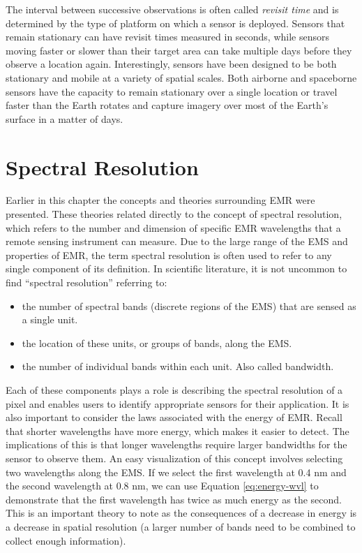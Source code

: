 \documentclass[
]{book}
\begin{document}
The interval between successive observations is often called \emph{revisit
time} and is determined by the type of platform on which a sensor is
deployed. Sensors that remain stationary can have revisit times measured
in seconds, while sensors moving faster or slower than their target area
can take multiple days before they observe a location again.
Interestingly, sensors have been designed to be both stationary and
mobile at a variety of spatial scales. Both airborne and spaceborne
sensors have the capacity to remain stationary over a single location or
travel faster than the Earth rotates and capture imagery over most of
the Earth's surface in a matter of days.

\hypertarget{spectral-resolution}{%
\section{Spectral Resolution}\label{spectral-resolution}}

Earlier in this chapter the concepts and theories surrounding EMR were
presented. These theories related directly to the concept of spectral
resolution, which refers to the number and dimension of specific EMR
wavelengths that a remote sensing instrument can measure. Due to the
large range of the EMS and properties of EMR, the term spectral
resolution is often used to refer to any single component of its
definition. In scientific literature, it is not uncommon to find
``spectral resolution'' referring to:

\begin{itemize}
\item
  the number of spectral bands (discrete regions of the EMS) that are
  sensed as a single unit.
\item
  the location of these units, or groups of bands, along the EMS.
\item
  the number of individual bands within each unit. Also called
  bandwidth.
\end{itemize}

Each of these components plays a role is describing the spectral
resolution of a pixel and enables users to identify appropriate sensors
for their application. It is also important to consider the laws
associated with the energy of EMR. Recall that shorter wavelengths
have more energy, which makes it easier to detect. The implications
of this is that longer wavelengths require larger bandwidths for the
sensor to observe them. An easy visualization of this concept involves
selecting two wavelengths along the EMS. If we select the first
wavelength at 0.4 nm and the second wavelength at 0.8 nm, we can use
Equation \eqref{eq:energy-wvl} to demonstrate that the first wavelength
has twice as much energy as the second. This is an important theory
to note as the consequences of a decrease in energy is a decrease in
spatial resolution (a larger number of bands need to be combined to
collect enough information).
\end{document}
